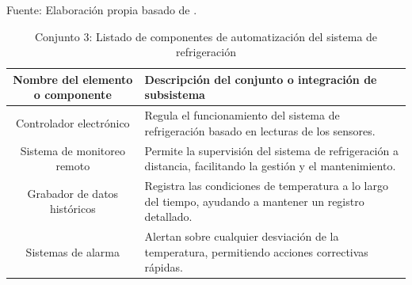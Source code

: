 	\begin{table}[H]
		\centering
		\caption{Conjunto 3: Listado de componentes de automatización del sistema de refrigeración}
		Fuente: Elaboración propia basado de .
		\begin{tabular}{@{}cl@{}}
	\toprule
	\begin{minipage}[t]{0.25\linewidth}\textbf{Nombre del elemento o componente}\end{minipage} & \begin{minipage}[t]{0.60\linewidth}\textbf{Descripción del conjunto o integración de subsistema}\end{minipage} \\
			
			 \midrule
			Controlador electrónico                   & \begin{minipage}[t]{0.6\linewidth}Regula el funcionamiento del sistema de refrigeración basado en lecturas de los sensores.\end{minipage} \\
			Sistema de monitoreo remoto               & \begin{minipage}[t]{0.6\linewidth}Permite la supervisión del sistema de refrigeración a distancia, facilitando la gestión y el mantenimiento.\end{minipage} \\
			Grabador de datos históricos              & \begin{minipage}[t]{0.6\linewidth}Registra las condiciones de temperatura a lo largo del tiempo, ayudando a mantener un registro detallado.\end{minipage} \\
			 Sistemas de alarma                        & \begin{minipage}[t]{0.6\linewidth}Alertan sobre cualquier desviación de la temperatura, permitiendo acciones correctivas rápidas.\end{minipage} \\ \bottomrule
		\end{tabular}
		\label{tabla:automatizacion}
	\end{table}
	
	
 
